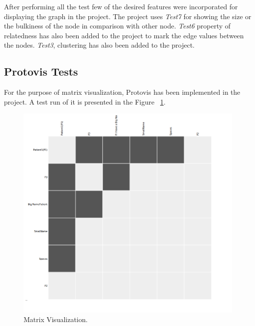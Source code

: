 \par After performing all the test few of the desired features were incorporated for displaying the graph in the project. The project uses \textit{Test7} for showing the size or the bulkiness of the node in comparison with other node. \textit{Test6} property of relatedness has also been added to the project to mark the edge values between the nodes. \textit{Test3}, clustering has also been added to the project.
\subsection{Protovis Tests}
For the purpose of matrix visualization, Protovis has been implemented in the project. A test run of it is presented in the Figure ~\ref{test8}.
\begin{figure}[H]
\centering
\includegraphics[scale=0.3]{d4b.png}
\caption{\label{test8}Matrix Visualization.}
\end{figure}


